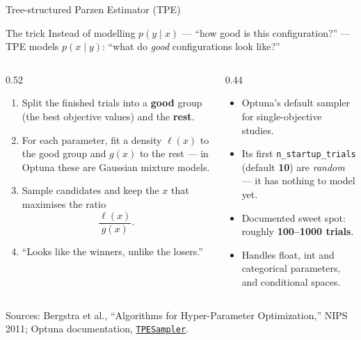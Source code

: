 
\begin{frame}{Tree-structured Parzen Estimator (TPE)}

    \begin{block}{The trick}
        Instead of modelling $p(y \mid x)$ --- ``how good is this configuration?'' --- TPE models
        $p(x \mid y)$: ``what do \emph{good} configurations look like?''
    \end{block}

    \vspace{0.12em}
    \begin{columns}[T]
        \begin{column}{0.52\textwidth}
            \scriptsize
            \begin{enumerate}
                \item Split the finished trials into a \textbf{good} group (the best objective values) and the
                      \textbf{rest}.
                \item For each parameter, fit a density $\ell(x)$ to the good group and $g(x)$ to the rest ---
                      in Optuna these are Gaussian mixture models.
                \item Sample candidates and keep the $x$ that maximises the ratio
                      \[ \frac{\ell(x)}{g(x)}. \]
                \item ``Looks like the winners, unlike the losers.''
            \end{enumerate}
        \end{column}
        \begin{column}{0.44\textwidth}
            \begin{tcolorbox}[colback=gray!8, colframe=gray!60, title=\scriptsize Practical notes]
                \scriptsize
                \begin{itemize}
                    \item Optuna's default sampler for single-objective studies.
                    \item Its first \texttt{n\_startup\_trials} (default \textbf{10}) are \emph{random} ---
                          it has nothing to model yet.
                    \item Documented sweet spot: roughly \textbf{100--1000 trials}.
                    \item Handles float, int and categorical parameters, and conditional spaces.
                \end{itemize}
            \end{tcolorbox}
        \end{column}
    \end{columns}

    \vspace{0.15em}
    {\scriptsize Sources: Bergstra et al., ``Algorithms for Hyper-Parameter Optimization,'' NIPS 2011;
    Optuna documentation, \href{https://optuna.readthedocs.io/en/stable/reference/samplers/generated/optuna.samplers.TPESampler.html}{\texttt{TPESampler}}.}

\end{frame}
